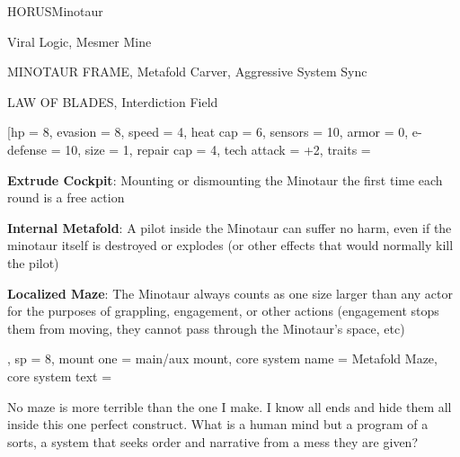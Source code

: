 
\begin{mech}{HORUS}{Minotaur}


\begin{license}
\item Viral Logic, Mesmer Mine
\item MINOTAUR FRAME, Metafold Carver, Aggressive System Sync
\item LAW OF BLADES, Interdiction Field
\end{license}


\frameBox
[hp = 8,
evasion = 8,
speed = 4,
heat cap = 6,
sensors = 10,
armor = 0,
e-defense = 10,
size = 1,
repair cap = 4,
tech attack = +2,
traits = {
      \textbf{Extrude Cockpit}: Mounting or dismounting the Minotaur the first time each round is a free action

      \textbf{Internal Metafold}: A pilot inside the Minotaur can suffer no harm, even if the minotaur itself is destroyed or explodes (or other effects that would normally kill the pilot)

      \textbf{Localized Maze}: The Minotaur always counts as one size larger than any actor for the purposes of grappling, engagement, or other actions (engagement stops them from moving, they cannot pass through the Minotaur's space, etc)
      },
sp = 8,
mount one = main/aux mount,
core system name = Metafold Maze,
core system text = {No maze is more terrible than the one I make. I know all ends and hide them all inside this one perfect construct. What is a human mind but a program of a sorts, a system that seeks order and narrative from a mess they are given?

}
\end{mech}
